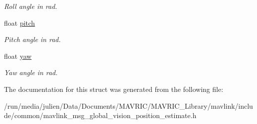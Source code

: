 \begin{DoxyCompactItemize}
\begin{DoxyCompactList}\small\item\em Roll angle in rad. \end{DoxyCompactList}\item 
\hypertarget{struct____mavlink__global__vision__position__estimate__t_ac36453fff07f0620a7c81c5eb31d8ce4}{float \hyperlink{struct____mavlink__global__vision__position__estimate__t_ac36453fff07f0620a7c81c5eb31d8ce4}{pitch}}\label{struct____mavlink__global__vision__position__estimate__t_ac36453fff07f0620a7c81c5eb31d8ce4}

\begin{DoxyCompactList}\small\item\em Pitch angle in rad. \end{DoxyCompactList}\item 
\hypertarget{struct____mavlink__global__vision__position__estimate__t_adcbed99801fc5b5e77817e56c9e74cce}{float \hyperlink{struct____mavlink__global__vision__position__estimate__t_adcbed99801fc5b5e77817e56c9e74cce}{yaw}}\label{struct____mavlink__global__vision__position__estimate__t_adcbed99801fc5b5e77817e56c9e74cce}

\begin{DoxyCompactList}\small\item\em Yaw angle in rad. \end{DoxyCompactList}\end{DoxyCompactItemize}


The documentation for this struct was generated from the following file\+:\begin{DoxyCompactItemize}
\item 
/run/media/julien/\+Data/\+Documents/\+M\+A\+V\+R\+I\+C/\+M\+A\+V\+R\+I\+C\+\_\+\+Library/mavlink/include/common/mavlink\+\_\+msg\+\_\+global\+\_\+vision\+\_\+position\+\_\+estimate.\+h\end{DoxyCompactItemize}
